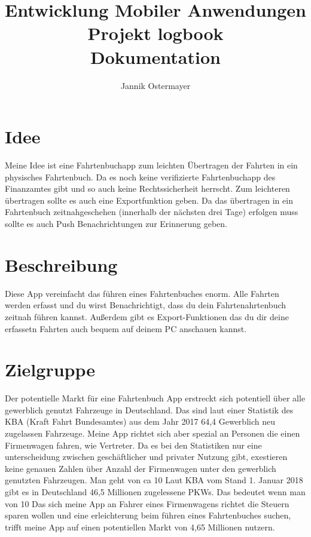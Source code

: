 \documentclass{article}
\title{Entwicklung Mobiler Anwendungen \\Projekt logbook \\ Dokumentation}
\author{Jannik Ostermayer}
\begin{document}
\begin{titlepage}
    \clearpage
    \maketitle          %
    \thispagestyle{empty}
\end{titlepage}

\tableofcontents    %
\pagebreak          %

\section{Idee}
Meine Idee ist eine Fahrtenbuchapp zum leichten Übertragen 
der Fahrten in ein physisches Fahrtenbuch.
Da es noch keine verifizierte Fahrtenbuchapp 
des Finanzamtes gibt und so auch keine Rechtssicherheit herrscht.
Zum leichteren übertragen sollte es auch eine Exportfunktion geben.
Da das übertragen in ein Fahrtenbuch zeitnahgeschehen (innerhalb der 
nächsten drei Tage) erfolgen muss sollte es auch Push Benachrichtungen
zur Erinnerung geben. 

\section{Beschreibung}
Diese App vereinfacht das führen eines Fahrtenbuches enorm. 
Alle Fahrten werden erfasst und du wirst Benachrichtigt, dass du dein 
Fahrtenahrtenbuch zeitnah führen kannst. 
Außerdem gibt es Export-Funktionen das du dir deine erfassetn Fahrten 
auch bequem auf deinem PC anschauen kannst.

\section{Zielgruppe}
Der potentielle Markt für eine Fahrtenbuch App erstreckt sich potentiell über alle
gewerblich genutzt Fahrzeuge in Deutschland. Das sind laut einer Statistik des KBA (Kraft Fahrt Bundesamtes)
aus dem Jahr 2017 64,4%
Gewerblich neu zugelassen Fahrzeuge. Meine App richtet sich aber spezial an Personen die einen
Firmenwagen fahren, wie Vertreter. Da es bei den Statistiken nur eine unterscheidung zwischen
geschäftlicher und privater Nutzung gibt, exestieren keine genauen Zahlen über Anzahl der Firmenwagen
unter den gewerblich genutzten Fahrzeugen. Man geht von ca 10%
Laut KBA vom Stand 1. Januar 2018 gibt es in Deutschland 46,5 Millionen zugelessene PKWs.
Das bedeutet wenn man von 10%
Das sich meine App an Fahrer eines Firmenwagens richtet die Steuern sparen wollen und eine
erleichterung beim führen eines Fahrtenbuches suchen, trifft meine App auf einen potentiellen
Markt von 4,65 Millionen nutzern.
\end{document}
